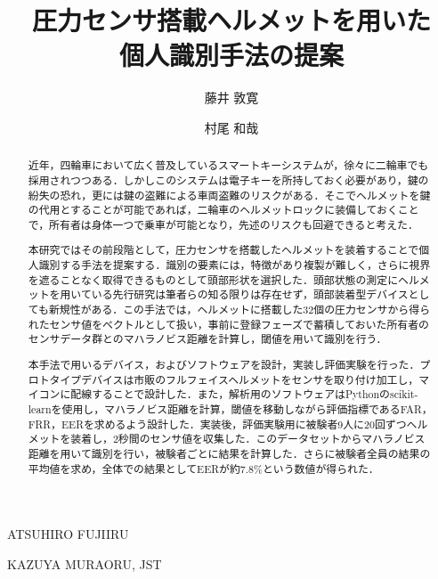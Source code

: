 \documentclass[Japanese]{dicomopapers}
\begin{document}
\title{圧力センサ搭載ヘルメットを用いた\\個人識別手法の提案}


\author{藤井 敦寛}{ATSUHIRO FUJII}{RU}
\author{村尾 和哉}{KAZUYA MURAO}{RU, JST}

\begin{abstract}
近年，四輪車において広く普及しているスマートキーシステムが，徐々に二輪車でも採用されつつある．しかしこのシステムは電子キーを所持しておく必要があり，鍵の紛失の恐れ，更には鍵の盗難による車両盗難のリスクがある．そこでヘルメットを鍵の代用とすることが可能であれば，二輪車のヘルメットロックに装備しておくことで，所有者は身体一つで乗車が可能となり，先述のリスクも回避できると考えた．\par
本研究ではその前段階として，圧力センサを搭載したヘルメットを装着することで個人識別する手法を提案する．識別の要素には，特徴があり複製が難しく，さらに視界を遮ることなく取得できるものとして頭部形状を選択した．頭部状態の測定にヘルメットを用いている先行研究は筆者らの知る限りは存在せず，頭部装着型デバイスとしても新規性がある．この手法では，ヘルメットに搭載した32個の圧力センサから得られたセンサ値をベクトルとして扱い，事前に登録フェーズで蓄積しておいた所有者のセンサデータ群とのマハラノビス距離を計算し，閾値を用いて識別を行う．\par
本手法で用いるデバイス，およびソフトウェアを設計，実装し評価実験を行った．プロトタイプデバイスは市販のフルフェイスヘルメットをセンサを取り付け加工し，マイコンに配線することで設計した．また，解析用のソフトウェアはPythonのscikit-learnを使用し，マハラノビス距離を計算，閾値を移動しながら評価指標であるFAR，FRR，EERを求めるよう設計した．実装後，評価実験用に被験者9人に20回ずつヘルメットを装着し，2秒間のセンサ値を収集した．このデータセットからマハラノビス距離を用いて識別を行い，被験者ごとに結果を計算した．さらに被験者全員の結果の平均値を求め，全体での結果としてEERが約7.8\%という数値が得られた．
\end{abstract}

\maketitle

\end{document}
